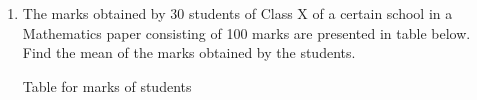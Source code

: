 \renewcommand{\theequation}{\theenumi}
\begin{enumerate}[label=\arabic*.,ref=\thesubsection.\theenumi]
\item The marks obtained by 30 students of Class X of a certain school in a Mathematics paper consisting of 100 marks are presented in table below. Find the mean of the marks obtained by the students.\\
\begin{table}[!ht]
	\centering
	
	\caption{ Table for marks of students}
\end{table}
\end{enumerate}
